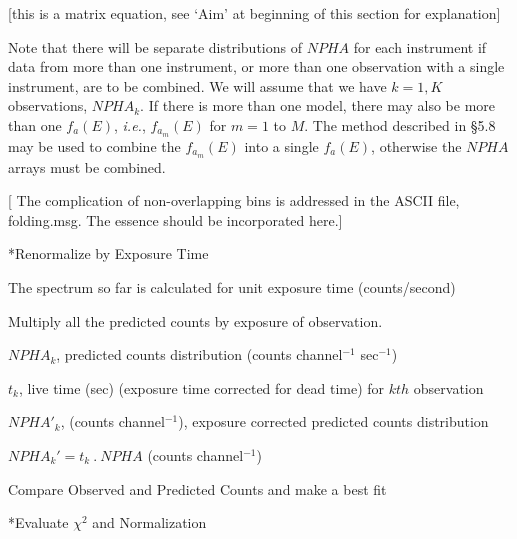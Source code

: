 {\list
 
[this is a matrix equation, see `Aim' at beginning of this section for explanation]

Note that there will be separate distributions of $NPHA$ for each
instrument if data from more than one instrument, or more than one
observation with a single instrument, are to be combined.
We will assume that we have $k=1,K$ observations, $NPHA_k$.
If there is more than one model, there may also be more than one
$f_a(E)$, {\it i.e.},
$f_{a_m}(E)$ for $m=1$ to $M$.  The method described in \S5.8 may be used to combine
the $f_{a_m}(E)$ into a single $f_a(E)$, otherwise the
$NPHA$ arrays must be combined.

[ The complication of non-overlapping bins is addressed in the ASCII
file, folding.msg. The essence should be incorporated here.]

}

\**Renormalize by Exposure Time
 
{\list


The spectrum so far is calculated for unit exposure time (counts/second)
 
Multiply all the predicted counts by exposure of observation.

 
$NPHA_k$, predicted counts distribution (counts channel$^{-1}$ sec$^{-1}$)

$t_k$, live time (sec) (exposure time corrected for dead time) for $kth$ observation

 
$NPHA'_k$, (counts channel$^{-1}$), exposure corrected predicted counts distribution


$NPHA_k' = t_k~.~NPHA$ (counts channel$^{-1}$)

}
 
\@{Compare Observed and Predicted Counts and make a best fit} 
 
\**Evaluate $\chi^{2}$ and Normalization


